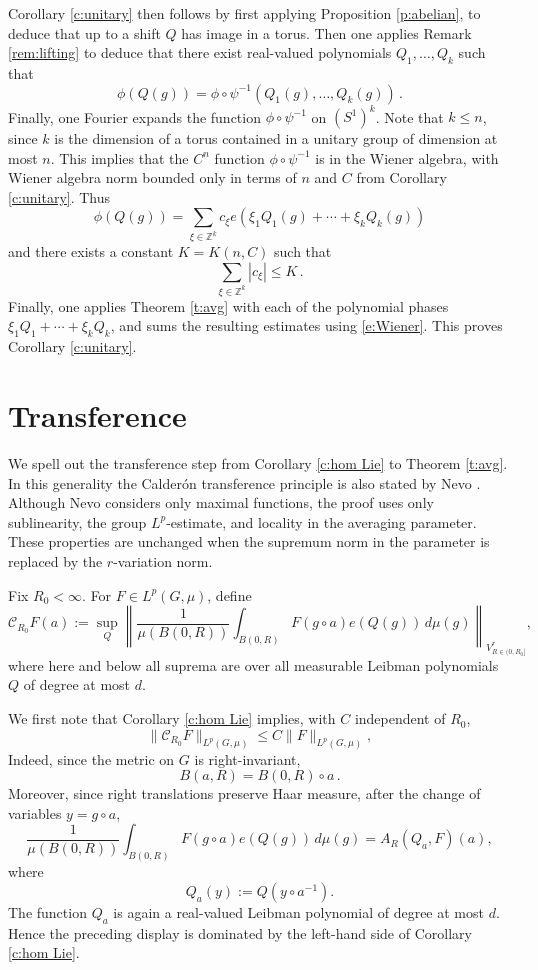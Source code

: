 \documentclass[12pt,reqno,a4paper,dvipsnames]{amsart}
\theoremstyle{plain}
\theoremstyle{definition}
\numberwithin{theorem}{section}
\numberwithin{equation}{section}
\begin{document}
Corollary \ref{c:unitary} then follows by first applying Proposition \ref{p:abelian}, to deduce that up to a shift $Q$ has image in a torus. Then one applies Remark \ref{rem:lifting} to deduce that there exist real-valued polynomials $Q_1, \dotsc, Q_k$ such that
\[
    \phi(Q(g)) = \phi \circ \psi^{-1}(Q_1(g), \dotsc, Q_k(g))\,.
\]
Finally, one Fourier expands the function $\phi \circ \psi^{-1}$ on $(S^1)^k$. Note that $k \le n$, since $k$ is the dimension of a torus contained in a unitary group of dimension at most $n$. This implies that the $C^n$ function $\phi \circ \psi^{-1}$ is in the Wiener algebra, with Wiener algebra norm bounded only in terms of $n$ and $C$ from Corollary \ref{c:unitary}. Thus 
\[
    \phi(Q(g)) = \sum_{\xi \in \mathbb{Z}^k} c_\xi e(\xi_1 Q_1(g) + \dotsb + \xi_k Q_k(g))
\]
and there exists a constant $K = K(n, C)$ such that
\begin{equation}\label{e:Wiener}
    \sum_{\xi \in \mathbb{Z}^k} |c_\xi| \le K\,.
\end{equation}
Finally, one applies Theorem \ref{t:avg} with each of the polynomial phases $\xi_1 Q_1 + \dotsb + \xi_k Q_k$, and sums the resulting estimates using \eqref{e:Wiener}. This proves Corollary \ref{c:unitary}.


\appendix

\section{Transference}\label{transference}

We spell out the transference step from Corollary \ref{c:hom Lie} to
Theorem \ref{t:avg}.  In this generality the Calderón transference principle is also stated by Nevo \cite[Theorem~6.2]{nevo}. Although Nevo considers only maximal functions, the proof uses only sublinearity, the group 
$L^p$-estimate, and locality in the averaging parameter.  These
properties are unchanged when the supremum norm in the parameter is
replaced by the $r$-variation norm. 

Fix $R_0<\infty$.  For $F\in L^p(G,\mu)$, define
\[
\mathcal C_{R_0}F(a)
:=
\sup_Q
\left\|
\frac{1}{\mu(B(0,R))}
\int_{B(0,R)}
F(g\circ a)e(Q(g))\,d\mu(g)
\right\|_{V^r_{R \in (0, R_0]}},
\]
where here and below all suprema are over all measurable Leibman polynomials $Q$ of degree at most $d$.

We first note that Corollary \ref{c:hom Lie} implies, with $C$ independent of $R_0$,
\[
        \|\mathcal C_{R_0}F\|_{L^p(G,\mu)}
        \le C\|F\|_{L^p(G,\mu)},
\]
Indeed, since the metric on $G$ is right-invariant,
\[
        B(a,R)=B(0,R)\circ a \,.
\]
Moreover, since right translations
preserve Haar measure,  after the change of variables
$y=g\circ a$,
\[
\frac{1}{\mu(B(0,R))}
\int_{B(0,R)}F(g\circ a)e(Q(g))\,d\mu(g)
=
A_R(Q_a,F)(a),
\]
where
\[
        Q_a(y):=Q(y\circ a^{-1}).
\]
The function $Q_a$ is again a real-valued Leibman polynomial of degree
at most $d$.  Hence the preceding display is dominated by
the left-hand side of Corollary  \ref{c:hom Lie}.
\end{document}
